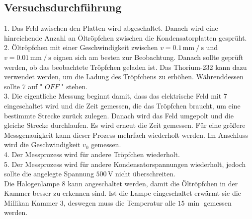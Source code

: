 \subsection{Versuchsdurchführung}


1. Das Feld zwischen den Platten wird abgeschaltet. Danach wird eine hinreichende Anzahl an Öltröpfchen zwischen die Kondensatorplatten gesprüht. \\

2. Öltröpfchen mit einer Geschwindigkeit zwischen $v = 0.1 \, \unit{\milli\meter} \mathbin{/} \unit{\second}$ und $v = 0.01 \, \unit{\milli\meter} \mathbin{/} \unit{\second}$ eignen sich am besten zur Beobachtung.
Danach sollte geprüft werden, ob das beobachtete Tröpfchen geladen ist. Das Thorium-232 kann dazu verwendet werden, um die Ladung des Tröpfchens zu erhöhen. Währenddessen sollte $7$ auf " $OFF$ " stehen. \\

3. Die eigentliche Messung beginnt damit, dass das elektrische Feld mit $7$ eingeschaltet wird und die Zeit gemessen, die das Tröpfchen braucht, um eine bestimmte Strecke zurück zulegen.
Danach wird das Feld umgepolt und die gleiche Strecke durchlaufen. Es wird erneut die Zeit gemessen. Für eine größere Messgenauigkeit kann dieser Prozess mehrfach wiederholt werden.
Im Anschluss wird die Geschwindigkeit $v_0$ gemessen. \\

4. Der Messprozess wird für andere Tröpfchen wiederholt.\\

5. Der Messprozess wird für andere Kondensatorspannungen wiederholt, jedoch sollte die angelegte Spannung $500 \, \unit{\volt}$ nicht überschreiten.\\

Die Halogenlampe $8$ kann angeschaltet werden, damit die Öltröpfchen in der Kammer besser zu erkennen sind.
Ist die Lampe eingeschaltet erwärmt sie die Millikan Kammer $3$, deswegen muss die Temperatur alle $15 \, \unit{\min}$ gemessen werden.
